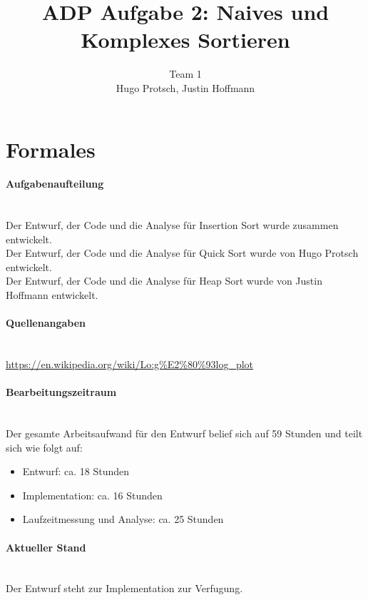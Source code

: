 \documentclass[11pt]{article}
\title{ADP Aufgabe 2: Naives und Komplexes Sortieren}
\author{Team 1\\Hugo Protsch, Justin Hoffmann}
\begin{document}
    \maketitle

    \tableofcontents

    \newpage


    \section{Formales}\label{sec:Formales}

    \paragraph*{Aufgabenaufteilung}\mbox{}\\
    Der Entwurf, der Code und die Analyse für Insertion Sort wurde zusammen
    entwickelt.\\
    Der Entwurf, der Code und die Analyse für Quick Sort wurde von Hugo Protsch
    entwickelt.\\
    Der Entwurf, der Code und die Analyse für Heap Sort wurde von Justin
    Hoffmann entwickelt.

    \paragraph*{Quellenangaben}\mbox{}\\
    \url{https://en.wikipedia.org/wiki/Lo:g%
    }

    \paragraph*{Bearbeitungszeitraum}\mbox{}\\
    Der gesamte Arbeitsaufwand für den Entwurf belief sich auf 59 Stunden
    und teilt sich wie folgt auf:
    \begin{itemize}
        \setlength\itemsep{0em}
        \item Entwurf: ca. 18 Stunden
        \item Implementation: ca. 16 Stunden
        \item Laufzeitmessung und Analyse: ca. 25 Stunden
    \end{itemize}

    \paragraph*{Aktueller Stand}\mbox{}\\
    Der Entwurf steht zur Implementation zur Verfugung.
\end{document}
